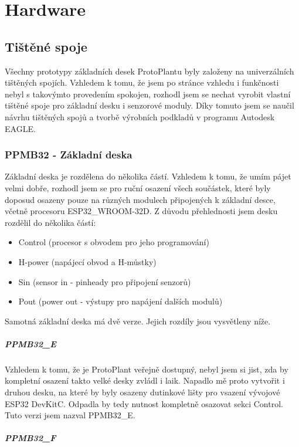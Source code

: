 \chapter{Hardware}

\section{Tištěné spoje}
Všechny prototypy základních desek ProtoPlantu byly založeny na univerzálních tištěných spojích. Vzhledem k tomu, že jsem po stránce vzhledu i funkčnosti nebyl s takovýmto provedením spokojen, rozhodl jsem se nechat vyrobit vlastní tištěné spoje pro základní desku i senzorové moduly.
Díky tomuto jsem se naučil návrhu tištěných spojů a tvorbě výrobních podkladů v programu Autodesk EAGLE.

\subsection{PPMB32 - Základní deska}
Základní deska je rozdělena do několika částí. Vzhledem k tomu, že umím pájet velmi dobře, rozhodl jsem se pro ruční osazení všech součástek, které byly doposud osazeny pouze na různých modulech připojených k základní desce, včetně procesoru ESP32_WROOM-32D.
Z důvodu přehlednosti jsem desku rozdělil do několika částí:
\begin{itemize}
    \item Control (procesor s obvodem pro jeho programování)
    \item H-power (napájecí obvod a H-můstky)
    \item Sin (sensor in - pinheady pro připojení senzorů)
    \item Pout (power out - výstupy pro napájení dalších modulů)
\end{itemize} 

Samotná základní deska má dvě verze. Jejich rozdíly jsou vysvětleny níže.

\paragraph{PPMB32_E}
Vzhledem k tomu, že je ProtoPlant veřejně dostupný, nebyl jsem si jist, zda by kompletní osazení takto velké desky zvládl i laik. Napadlo mě proto vytvořit i druhou desku, na které by byly osazeny dutinkové lišty pro vsazení vývojové ESP32 DevKitC. Odpadla by tedy nutnost kompletně osazovat sekci Control. Tuto verzi jsem nazval PPMB32_E.

\paragraph{PPMB32_F}


